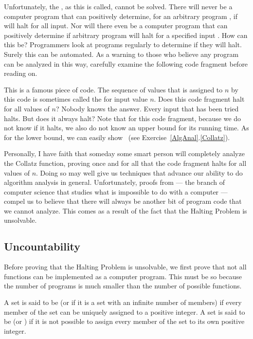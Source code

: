 Unfortunately, the , as this is called, cannot
be solved.
There will never be a computer program that can positively determine,
for an arbitrary program , if 
will halt for all input.
Nor will there even be a computer program that can positively
determine if arbitrary program  will halt for a specified
input .
How can this be?
Programmers look at programs regularly to determine if they will
halt.
Surely this can be automated.
As a warning to those who believe any program can be analyzed in this
way, carefully examine the following code fragment before reading on.


This is a famous piece of code.
The sequence of values that is assigned to \(n\) by this code is
sometimes called the  for input value \(n\).
Does this code fragment halt for all values of \(n\)?
Nobody knows the answer.
Every input that has been tried halts.
But does it always halt?
Note that for this code fragment, because we do not know if it halts,
we also do not know an upper bound for its running time.
As for the lower bound, we can easily show
\Omegalogn\ (see Exercise~\ref{AlgAnal}.\ref{Collatz}).

Personally, I have faith that someday some smart person will
completely analyze the Collatz function, proving once and for all
that the code fragment halts for all values of \(n\).
Doing so may well give us techniques that advance our ability to do
algorithm analysis in general.
Unfortunately, proofs from  --- the branch of
computer science that studies what is impossible to do with a computer
--- compel us to believe that there will always be another
bit of program code that we cannot analyze.
This comes as a result of the fact that the Halting Problem is
unsolvable.

\subsection{Uncountability}
\label{UncountSec}

Before proving that the Halting Problem is unsolvable, we first prove
that not all functions can be implemented as a computer program.
This must be so because the number of programs is much smaller than
the number of possible functions.

A set is said to be  (or 
if it is a set with an infinite number of members)
if every member of the set can be uniquely assigned to a positive
integer.
A set is said to be 
(or ) if it is not possible to 
assign every member of the set to its own positive integer.

